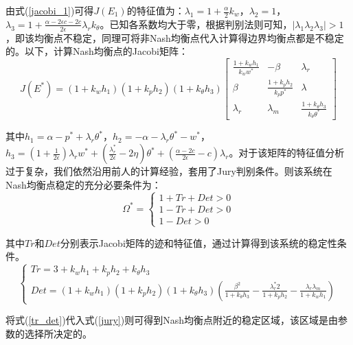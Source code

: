 \documentclass{article}
\begin{document}
\par 由式(\ref{jacobi_1})可得$J(E_1)$的特征值为：$\lambda_1=1+\frac{\alpha}{2}k_w$，$\lambda_2=1$，$\lambda_3=1+\frac{\alpha-2\epsilon c-2c}{2\epsilon}\lambda_rk_\theta$。已知各系数均大于零，根据判别法则可知，$|\lambda_1\lambda_2\lambda_3|>1$，即该均衡点不稳定，同理可将非Nash均衡点代入计算得边界均衡点都是不稳定的。以下，计算Nash均衡点的Jacobi矩阵：
\begin{equation}
    J(E^*)=
    (1+k_wh_1)(1+k_ph_2)(1+k_\theta h_3)
    \left[
    \begin{array}{ccc}
        \frac{1+k_wh_1}{k_ww^*} & -\beta & \lambda_r \\
        \beta & \frac{1+k_ph_2}{k_pp^*} & \lambda \\
        \lambda_r & \lambda_m & \frac{1+k_\theta h_3}{k_\theta\theta^*}
    \end{array}
    \right]
\end{equation}
\par 其中$h_1=\alpha-p^*+\lambda_r\theta^*$，$h_2=-\alpha-\lambda_r\theta^*-w^*$，$h_3=(1+\frac{1}{2\epsilon})\lambda_rw^*+(\frac{\lambda_r^*}{2\epsilon}-2\eta)\theta^*+(\frac{\alpha-2c}{2\epsilon}-c)\lambda_r$。对于该矩阵的特征值分析过于复杂，我们依然沿用前人的计算经验，套用了Jury判别条件\cite{2017Tang}。则该系统在Nash均衡点稳定的充分必要条件为：
\begin{equation}\label{jury}
    \Omega^*=
    \left\{
    \begin{array}{rl}
        1+Tr+Det>0 \\
        1-Tr+Det>0 \\
        1-Det>0
    \end{array}
    \right.
\end{equation}
\par 其中$Tr$和$Det$分别表示Jacobi矩阵的迹和特征值，通过计算得到该系统的稳定性条件。
\begin{equation}\label{tr_det}
    \left\{
    \begin{array}{l}
        Tr=3+k_wh_1+k_ph_2+k_\theta h_3 \\
        Det= (1+k_wh_1)(1+k_ph_2)(1+k_\theta h_3)(\frac{\beta^2}{1+k_\theta h_3}-\frac{\lambda_r^*2}{1+k_ph_2}-\frac{\lambda_r\lambda_m}{1+k_wh_1})
    \end{array}
    \right.
\end{equation}
\par 将式(\ref{tr_det})代入式(\ref{jury})则可得到Nash均衡点附近的稳定区域，该区域是由参数的选择所决定的。
\end{document}

